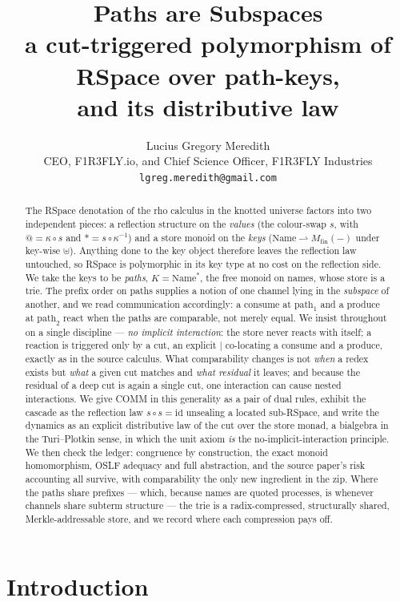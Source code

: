 \documentclass[11pt]{article}
\title{\textbf{Paths are Subspaces}\\[2pt]
\large a cut-triggered polymorphism of RSpace over path-keys,\\ and its distributive law}
\author{Lucius Gregory Meredith\\
\small CEO, F1R3FLY.io, and Chief Science Officer, F1R3FLY Industries\\
\small\texttt{lgreg.meredith@gmail.com}}
\date{}
\makeatletter
\theoremstyle{plain}
\theoremstyle{definition}
\newcommand{\Name}{\mathrm{Name}}
\newcommand{\Mfin}{M_{\mathrm{fin}}}
\newcommand{\quo}{@}
\newcommand{\der}{{\ast}}
\newcommand{\rr}{\rightharpoonup}
\makeatother
\begin{document}
\maketitle

\begin{abstract}
The RSpace denotation of the rho calculus in the knotted universe factors into two independent
pieces: a reflection structure on the \emph{values} (the colour-swap $s$, with $\quo=\kappa\circ s$
and $\der=s\circ\kappa^{-1}$) and a store monoid on the \emph{keys}
($\Name\rr\Mfin(-)$ under key-wise $\uplus$). Anything done to the key object therefore leaves the
reflection law untouched, so RSpace is polymorphic in its key type at no cost on the reflection side.
We take the keys to be \emph{paths}, $K=\Name^{\ast}$, the free monoid on names, whose store is a
trie. The prefix order on paths supplies a notion of one channel lying in the \emph{subspace} of
another, and we read communication accordingly: a consume at $\mathrm{path}_1$ and a produce at
$\mathrm{path}_2$ react when the paths are comparable, not merely equal. We insist throughout on a
single discipline --- \emph{no implicit interaction}: the store never reacts with itself; a reaction
is triggered only by a cut, an explicit $\mid$ co-locating a consume and a produce, exactly as in
the source calculus. What comparability changes is not \emph{when} a redex exists but \emph{what} a
given cut matches and \emph{what residual} it leaves; and because the residual of a deep cut is again
a single cut, one interaction can cause nested interactions. We give COMM in this generality as a
pair of dual rules, exhibit the cascade as the reflection law $s\circ s=\mathrm{id}$ unsealing a
located sub-RSpace, and write the dynamics as an explicit distributive law of the cut over the store
monad, a bialgebra in the Turi--Plotkin sense, in which the unit axiom \emph{is} the
no-implicit-interaction principle. We then check the ledger: congruence by construction, the exact
monoid homomorphism, OSLF adequacy and full abstraction, and the source paper's risk accounting all
survive, with comparability the only new ingredient in the zip. Where the paths share prefixes ---
which, because names are quoted processes, is whenever channels share subterm structure --- the trie
is a radix-compressed, structurally shared, Merkle-addressable store, and we record where each
compression pays off.
\end{abstract}

\section{Introduction}
\end{document}
